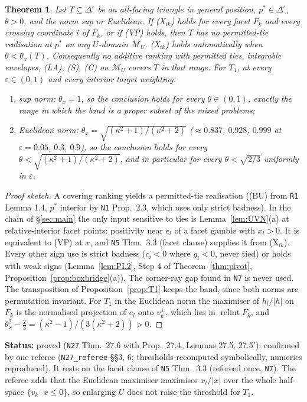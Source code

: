 \documentclass[11pt]{article}
\newtheorem{theorem}{Theorem}[section]
\theoremstyle{definition}
\theoremstyle{remark}
\newcommand{\Di}{\Delta^{\circ}}
\newcommand{\M}{\mathcal M}
\newcommand{\relint}{\operatorname{relint}}
\newcommand{\src}[1]{\texttt{#1}}
\newcommand{\status}[1]{\par\smallskip\noindent\textbf{Status:} #1\par\smallskip}
\begin{document}
\begin{theorem}\label{thm:permitted}
Let $T\subseteq\Di$ be an all-facing triangle in general position, $p^*\in\Di$, $\theta>0$, and the norm sup or Euclidean. If (X$_{ik}$) holds for every facet $F_k$ and every crossing coordinate $i$ of $F_k$, or if (VP) holds, then $T$ has no permitted-tie realisation at $p^*$ on any $U$-domain $\M_U$. (X$_{ik}$) holds automatically when $\theta<\theta_x(T)$. Consequently no additive ranking with permitted ties, integrable envelopes, (LA), (S), (C) on $\M_U$ covers $T$ in that range. For $T_1$, at every $\varepsilon\in(0,1)$ and every interior target weighting:
\begin{enumerate}[leftmargin=*,label=(\alph*)]
\item sup norm: $\theta_x=1$, so the conclusion holds for every $\theta\in(0,1)$, exactly the range in which the band is a proper subset of the mixed problems;
\item Euclidean norm: $\theta_x=\sqrt{(\kappa^2+1)/(\kappa^2+2)}$ ($\approx0.837$, $0.928$, $0.999$ at $\varepsilon=0.05$, $0.3$, $0.9$), so the conclusion holds for every $\theta<\sqrt{(\kappa^2+1)/(\kappa^2+2)}$, and in particular for every $\theta<\sqrt{2/3}$ uniformly in $\varepsilon$.
\end{enumerate}
\end{theorem}
\begin{proof}[Proof sketch]
A covering ranking yields a permitted-tie realisation ((BU) from \src{R1} Lemma 1.4, $p^*$ interior by \src{N1} Prop.~2.3, which uses only strict badness). In the chain of \S\ref{sec:main} the only input sensitive to ties is Lemma~\ref{lem:UVN}(a) at relative-interior facet points: positivity near $e_l$ of a facet gamble with $x_l>0$. It is equivalent to (VP) at $x$, and \src{N5} Thm.~3.3 (facet clause) supplies it from (X$_{lk}$). Every other sign use is strict badness ($c_i<0$ where $g_i<0$, never tied) or holds with weak signs (Lemma~\ref{lem:PL2}, Step 4 of Theorem~\ref{thm:pivot}, Proposition~\ref{prop:boxbridge}(a)). The corner-ray gap found in \src{N7} is never used. The transposition of Proposition~\ref{prop:T1} keeps the band, since both norms are permutation invariant. For $T_1$ in the Euclidean norm the maximiser of $h_l/|h|$ on $F_k$ is the normalised projection of $e_l$ onto $v_k^\perp$, which lies in $\relint F_k$, and $\theta_x^2-\tfrac23=(\kappa^2-1)/(3(\kappa^2+2))>0$.
\end{proof}
\status{proved (\src{N27} Thm.~27.6 with Prop.~27.4, Lemmas 27.5, 27.5$'$); confirmed by one referee (\src{N27\_referee} \S\S3, 6; thresholds recomputed symbolically, numerics reproduced). It rests on the facet clause of \src{N5} Thm.~3.3 (refereed once, \src{N7}). The referee adds that the Euclidean maximiser maximises $x_l/|x|$ over the whole half-space $\{v_k\cdot x\le0\}$, so enlarging $U$ does not raise the threshold for $T_1$.}
\end{document}
